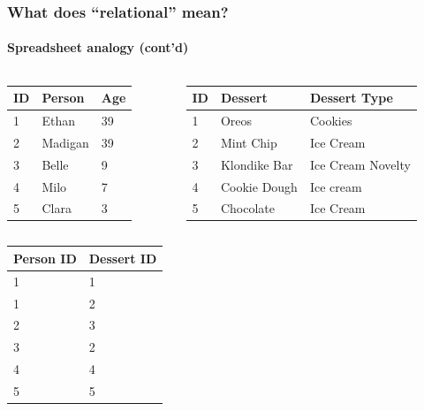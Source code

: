 \documentclass[aspectratio=169]{beamer}
\begin{document}
\begin{frame}
  \frametitle{What does ``relational'' mean?}
  \framesubtitle{Spreadsheet analogy (cont'd)}
  \begin{columns}[T]
    \begin{column}{0.3\textwidth}
      \noindent
      \begin{table}[]
        \footnotesize
        \begin{tabular}{@{}lll@{}}
          \toprule
          ID & Person  & Age \\ \midrule
          1  & Ethan   & 39  \\
          2  & Madigan & 39  \\
          3  & Belle   & 9   \\
          4  & Milo    & 7   \\
          5  & Clara   & 3   \\ \bottomrule
        \end{tabular}
      \end{table}
    \end{column}
    \begin{column}{0.5\textwidth}
      \begin{table}[]
        \footnotesize
        \begin{tabular}{@{}lll@{}}
          \toprule
          ID & Dessert      & Dessert Type      \\ \midrule
          1  & Oreos        & Cookies           \\
          2  & Mint Chip    & Ice Cream         \\
          3  & Klondike Bar & Ice Cream Novelty \\
          4  & Cookie Dough & Ice cream         \\
          5  & Chocolate    & Ice Cream         \\ \bottomrule
        \end{tabular}
      \end{table}
    \end{column}
  \end{columns}

  \begin{table}[]
    \footnotesize
    \begin{tabular}{@{}ll@{}}
      \toprule
      Person ID & Dessert ID \\ \midrule
      1         & 1          \\
      1         & 2          \\
      2         & 3          \\
      3         & 2          \\
      4         & 4          \\
      5         & 5          \\ \bottomrule
    \end{tabular}
  \end{table}
\end{frame}
\end{document}
